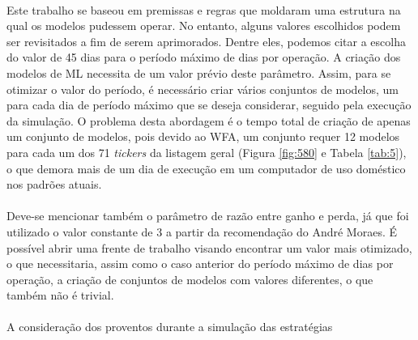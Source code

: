 \paragraph{} Este trabalho se baseou em premissas e regras que moldaram uma estrutura na qual os modelos pudessem operar. No entanto, alguns valores escolhidos podem ser revisitados a fim de serem aprimorados. Dentre eles, podemos citar a escolha do valor de 45 dias para o período máximo de dias por operação. A criação dos modelos de ML necessita de um valor prévio deste parâmetro. Assim, para se otimizar o valor do período, é necessário criar vários conjuntos de modelos, um para cada dia de período máximo que se deseja considerar, seguido pela execução da simulação. O problema desta abordagem é o tempo total de criação de apenas um conjunto de modelos, pois devido ao WFA, um conjunto requer 12 modelos para cada um dos 71 \textit{tickers} da listagem geral (Figura \ref{fig:580} e Tabela \ref{tab:5}), o que demora mais de um dia de execução em um computador de uso doméstico nos padrões atuais.

\paragraph{} Deve-se mencionar também o parâmetro de razão entre ganho e perda, já que foi utilizado o valor constante de 3 a partir da recomendação do André Moraes. É possível abrir uma frente de trabalho visando encontrar um valor mais otimizado, o que necessitaria, assim como o caso anterior do período máximo de dias por operação, a criação de conjuntos de modelos com valores diferentes, o que também não é trivial.

\paragraph{} A consideração dos proventos durante a simulação das estratégias
